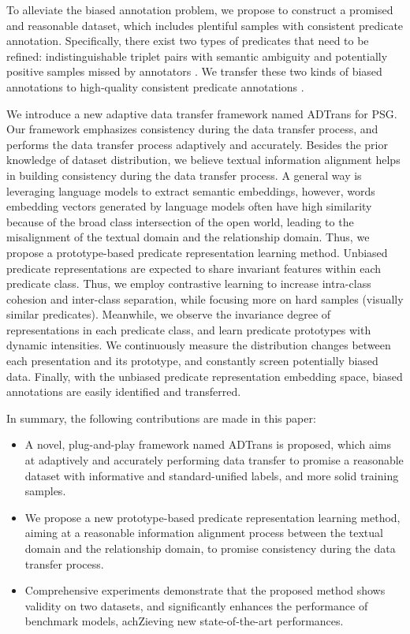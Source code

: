 \documentclass[letterpaper]{article} %
\begin{document}
To alleviate the biased annotation problem, we propose to construct a promised and reasonable dataset, which includes plentiful samples with consistent predicate annotation. Specifically, there exist two types of predicates that need to be refined: indistinguishable triplet pairs with semantic ambiguity and potentially positive samples missed by annotators \cite{zhang2022fine}. We transfer these two kinds of biased annotations to high-quality consistent predicate annotations \cite{zhang2023revisiting,lv2022personalizing}. 

We introduce a new adaptive data transfer framework named ADTrans for PSG. Our framework emphasizes consistency during the data transfer process, and performs the data transfer process adaptively and accurately. Besides the prior knowledge of dataset distribution, we believe textual information alignment helps in building consistency during the data transfer process. A general way is leveraging language models to extract semantic embeddings, however, words embedding vectors generated by language models often have high similarity because of the broad class intersection of the open world, leading to the misalignment of the textual domain and the relationship domain. Thus, we propose a prototype-based predicate representation learning method. Unbiased predicate representations are expected to share invariant features within each predicate class. Thus, we employ contrastive learning to increase intra-class cohesion and inter-class separation, while focusing more on hard samples (visually similar predicates). Meanwhile, we observe the invariance degree of representations in each predicate class, and learn predicate prototypes with dynamic intensities. We continuously measure the distribution changes between each presentation and its prototype, and constantly screen potentially biased data. Finally, with the unbiased predicate representation embedding space, biased annotations are easily identified and transferred.




In summary, the following contributions are made in this paper: 
\begin{itemize}
    \item A novel, plug-and-play framework named ADTrans is proposed, which aims at adaptively and accurately performing data transfer to promise a reasonable dataset with informative and standard-unified labels, and more solid training samples. 
    \item We propose a new prototype-based predicate representation learning method, aiming at a reasonable information alignment process between the textual domain and the relationship domain, to promise consistency during the data transfer process.
    \item Comprehensive experiments demonstrate that the proposed method shows validity on two datasets, and significantly enhances the performance of benchmark models, achZieving new state-of-the-art performances.
\end{itemize}
\end{document}

